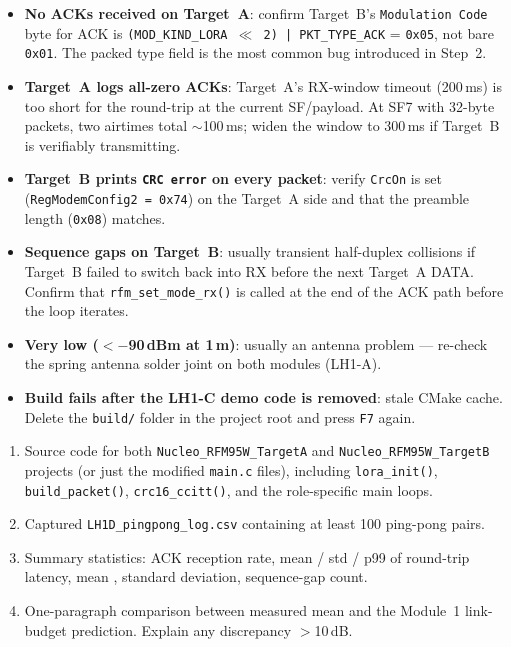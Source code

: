 \documentclass[11pt,letterpaper]{article}
\begin{document}
\begin{tcolorbox}[warning={Troubleshooting}]
	\begin{itemize}[leftmargin=1.2em]
		\item \textbf{No ACKs received on Target~A}: confirm Target~B's \texttt{Modulation Code} byte for ACK is \texttt{(MOD\_KIND\_LORA $\ll$ 2) | PKT\_TYPE\_ACK} = \texttt{0x05}, not bare \texttt{0x01}. The packed type field is the most common bug introduced in Step~2.
		\item \textbf{Target~A logs all-zero ACKs}: Target~A's RX-window timeout (200\,ms) is too short for the round-trip at the current SF/payload. At SF7 with 32-byte packets, two airtimes total $\sim$100\,ms; widen the window to 300\,ms if Target~B is verifiably transmitting.
		\item \textbf{Target~B prints \texttt{CRC error} on every packet}: verify \texttt{CrcOn} is set (\texttt{RegModemConfig2 = 0x74}) on the Target~A side and that the preamble length (\texttt{0x08}) matches.
		\item \textbf{Sequence gaps on Target~B}: usually transient half-duplex collisions if Target~B failed to switch back into RX before the next Target~A DATA. Confirm that \texttt{rfm\_set\_mode\_rx()} is called at the end of the ACK path before the loop iterates.
		\item \textbf{Very low \RSSI{} ($<-$90\,dBm at 1\,m)}: usually an antenna problem --- re-check the spring antenna solder joint on both modules (LH1-A).
		\item \textbf{Build fails after the LH1-C demo code is removed}: stale \mbox{CMake} cache. Delete the \texttt{build/} folder in the project root and press \texttt{F7} again.
	\end{itemize}
\end{tcolorbox}

\begin{tcolorbox}[deliverable={Lab Handout 1-D Deliverable}]
	\begin{enumerate}[leftmargin=1.2em]
		\item Source code for both \texttt{Nucleo\_RFM95W\_TargetA} and \texttt{Nucleo\_RFM95W\_TargetB} projects (or just the modified \texttt{main.c} files), including \texttt{lora\_init()}, \texttt{build\_packet()}, \texttt{crc16\_ccitt()}, and the role-specific main loops.
		\item Captured \texttt{LH1D\_pingpong\_log.csv} containing at least 100 ping-pong pairs.
		\item Summary statistics: ACK reception rate, mean / std / p99 of round-trip latency, mean \RSSI{}, \RSSI{} standard deviation, sequence-gap count.
		\item One-paragraph comparison between measured mean \RSSI{} and the Module~1 link-budget prediction. Explain any discrepancy $>$10\,dB.
	\end{enumerate}
\end{tcolorbox}

\printhandoutglossary
\end{document}
